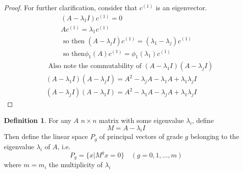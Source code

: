 \documentclass[twoside]{amsart}
\theoremstyle{plain}
\theoremstyle{definition}
\newtheorem{definition}{Definition}
\begin{document}
\begin{proof}
\footnotesize For further clarification, consider that $c^{(1)}$ is an eigenvector.  
\begin{gather*}
  (A-\lambda_1 I) c^{(1)} = 0 \\
  Ac^{(1)} = \lambda_1 c^{(1)} \\
  \text{ so then } (A- \lambda_j I) c^{(1)} = (\lambda_1 - \lambda_j) c^{(1)} \\
  \text{ so then} \phi_1(A) c^{(1)} = \phi_1(\lambda_1) c^{(1)}
\end{gather*}
\begin{align*}
 \, & \text{ Also note the commutability of } (A-\lambda_1 I)(A-\lambda_j I) \\
 \, &  (A-\lambda_1 I)(A-\lambda_j I) = A^2 - \lambda_j A - \lambda_1 A + \lambda_1 \lambda_j I \\
 \, &  (A-\lambda_j I)(A-\lambda_1 I) = A^2 - \lambda_1 A - \lambda_j A + \lambda_1 \lambda_j I
\end{align*}
\end{proof}

\normalsize
\begin{definition}
  For any $A$ $n \times n$ matrix with some eigenvalue $\lambda_i$, define
  \[
  M = A - \lambda_i I
  \]
Then define the linear space $P_g$ of principal vectors of grade $g$ belonging to the eigenvalue $\lambda_i$ of $A$, i.e.
\begin{equation}\label{E:Principal_vector_linear_space_definition}
  P_g = \{ x | M^g x =0 \} \quad (g = 0,1, \dots , m)
\end{equation}
where $m = m_i$ the multiplicity of $\lambda_i$
\end{definition}
\end{document}
